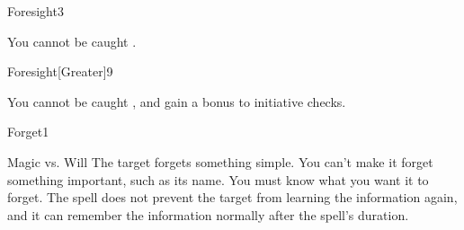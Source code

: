 \begin{spellsection}{Foresight}{3}
    \begin{spellheader}
    \end{spellheader}
    \begin{spellcontent}
        \begin{spelleffects}
            \spelleffect You cannot be caught \unaware.
            \spelldur \durlong
        \end{spelleffects}
    \end{spellcontent}
    \begin{spellfooter}
        \miscastexplode
    \end{spellfooter}
\end{spellsection}

\begin{spellsection}{Foresight}[Greater]{9}
    \begin{spellheader}
    \end{spellheader}
    \begin{spellcontent}
        \begin{spelleffects}
            \spelleffect You cannot be caught \unaware, and gain a  bonus to initiative checks.
            \spelldur \durlong
        \end{spelleffects}
    \end{spellcontent}
    \begin{spellfooter}
        \miscastexplode
    \end{spellfooter}
\end{spellsection}

\begin{spellsection}{Forget}{1}
    \begin{spellheader}
    \end{spellheader}
    \begin{spellcontent}
        \begin{spelltargetinginfo}
        \end{spelltargetinginfo}
        \begin{spelleffects}
            \begin{spellattack}{Magic vs. Will}
                \spelleffect The target forgets something simple. You can't make it forget something important, such as its name. You must know what you want it to forget. The spell does not prevent the target from learning the information again, and it can remember the information normally after the spell's duration.
            \end{spellattack}
            \spelldur \durlong
        \end{spelleffects}
    \end{spellcontent}
    \begin{spellfooter}
        \miscastrandom
    \end{spellfooter}
\end{spellsection}

